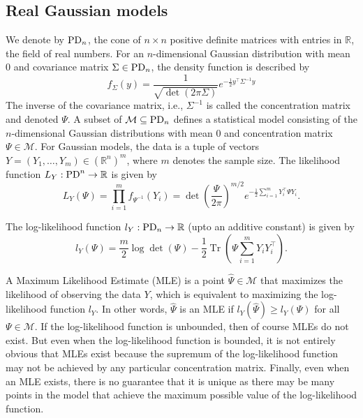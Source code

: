 \documentclass[11pt]{amsart}
\theoremstyle{definition}
\newcommand{\R}{{\mathbb R}}
\newcommand{\PD} {{\rm PD}}
\newcommand{\tnr}{\operatorname{Tr}}
\begin{document}
\subsection{Real Gaussian models}
We denote by $\PD_n$, the cone of $n \times n$ positive definite matrices with entries in $\R$, the field of real numbers. For an $n$-dimensional Gaussian distribution with mean $0$ and covariance matrix $\Sigma \in \PD_n$, the density function is described by 
$$
f_\Sigma(y) = \frac{1}{\sqrt{\det(2 \pi \Sigma)}} e^{- \frac{1}{2} y^\top \Sigma^{-1} y}
$$
The inverse of the covariance matrix, i.e., $\Sigma^{-1}$ is called the concentration matrix and denoted $\Psi$. A subset of $\mathcal{M} \subseteq \PD_n$ defines a statistical model consisting of the $n$-dimensional Gaussian distributions with mean $0$ and concentration matrix $\Psi \in \mathcal{M}$. For Gaussian models, the data is a tuple of vectors $Y = (Y_1,\dots,Y_m) \in (\R^n)^m$, where $m$ denotes the sample size. The likelihood function $L_Y: \PD^n \rightarrow \R$ is given by 
$$
L_Y(\Psi) = \prod_{i=1}^m f_{\Psi^{-1}}(Y_i) = \det\left(\frac{\Psi}{2 \pi}\right)^{m/2} e^{-\frac{1}{2} \sum_{i=1}^m Y_i^\top \Psi Y_i}.
$$


The log-likelihood function $l_Y: \PD_n \rightarrow \R$ (upto an additive constant) is given by
$$
l_Y(\Psi) = \frac{m}{2}\log \det(\Psi) - \frac{1}{2}\tnr \left(\Psi \sum_{i=1}^m Y_iY_i^\top \right).
$$

A Maximum Likelihood Estimate (MLE) is a point $\widehat{\Psi} \in \mathcal{M}$ that maximizes the likelihood of observing the data $Y$, which is equivalent to maximizing the log-likelihood function $l_Y$. In other words, $\widehat{\Psi}$ is an MLE if $l_Y(\widehat{\Psi}) \geq l_Y(\Psi)$ for all $\Psi \in \mathcal{M}$. If the log-likelihood function is unbounded, then of course MLEs do not exist. But even when the log-likelihood function is bounded, it is not entirely obvious that MLEs exist because the supremum of the log-likelihood function may not be achieved by any particular concentration matrix. Finally, even when an MLE exists, there is no guarantee that it is unique as there may be many points in the model that achieve the maximum possible value of the log-likelihood function. %
\end{document}
